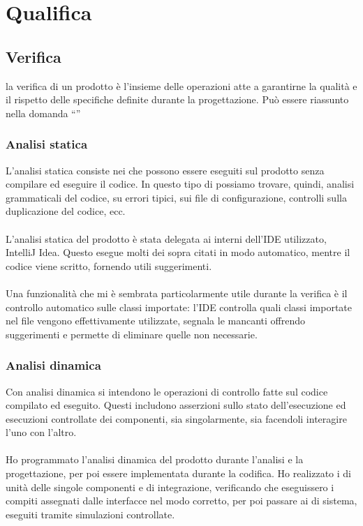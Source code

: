 \section{Qualifica}
	\subsection{Verifica}
	la verifica di un prodotto è l'insieme delle operazioni atte a garantirne la qualità e il rispetto delle specifiche definite durante la progettazione. Può essere riassunto nella domanda ``''
		\subsubsection{Analisi statica}
		L'analisi statica consiste nei  che possono essere eseguiti sul prodotto senza compilare ed eseguire il codice. In questo tipo di  possiamo trovare, quindi, analisi grammaticali del codice,  su errori tipici,  sui file di configurazione, controlli sulla duplicazione del codice, ecc.
		\paragraph*{}
		L'analisi statica del prodotto è stata delegata ai  interni dell'IDE utilizzato, IntelliJ Idea. Questo esegue molti dei  sopra citati in modo automatico, mentre il codice viene scritto, fornendo utili suggerimenti.
		\paragraph*{}
		Una funzionalità che mi è sembrata particolarmente utile durante la verifica è il controllo automatico sulle classi importate: l'IDE controlla quali classi importate nel file vengono effettivamente utilizzate, segnala le mancanti offrendo suggerimenti e permette di eliminare quelle non necessarie.

		\subsubsection{Analisi dinamica}
		Con analisi dinamica si intendono le operazioni di controllo fatte sul codice compilato ed eseguito. Questi  includono asserzioni sullo stato dell'esecuzione ed esecuzioni controllate dei componenti, sia singolarmente, sia facendoli interagire l'uno con l'altro.
		\paragraph*{}
		Ho programmato l'analisi dinamica del prodotto durante l'analisi e la progettazione, per poi essere implementata durante la codifica. Ho realizzato i  di unità delle singole componenti e di integrazione, verificando che eseguissero i compiti assegnati dalle interfacce nel modo corretto, per poi passare ai  di sistema, eseguiti tramite simulazioni controllate.
